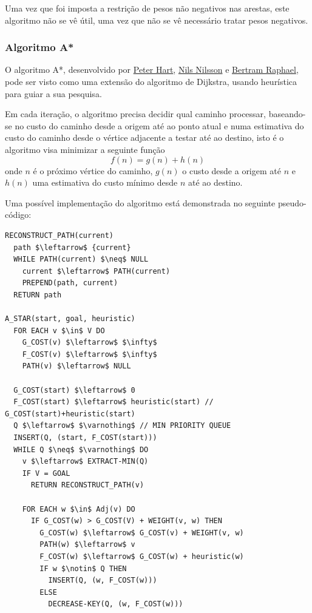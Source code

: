 \documentclass[article, a4paper, 12pt, oneside]{memoir}
\begin{document}
Uma vez que foi imposta a restrição de pesos não negativos nas arestas, este algoritmo não se vê útil, uma vez que não se vê necessário tratar pesos negativos.

\subsubsection{Algoritmo A*}
O algoritmo A*, desenvolvido por \href{https://en.wikipedia.org/wiki/Peter_E._Hart}{Peter Hart}, \href{https://en.wikipedia.org/wiki/Nils_John_Nilsson}{Nils Nilsson} e \href{https://en.wikipedia.org/wiki/Bertram_Raphael}{Bertram Raphael}, pode ser visto como uma extensão do algoritmo de Dijkstra, usando heurística para guiar a sua pesquisa.

Em cada iteração, o algoritmo precisa decidir qual caminho processar, baseando-se no custo  do caminho desde a origem até ao ponto atual e numa estimativa do custo do caminho desde o vértice adjacente a testar até ao destino, isto é o algoritmo visa minimizar a seguinte função
\begin{equation}
f(n) = g(n) + h(n)
\end{equation}
onde $n$ é o próximo vértice do caminho, $g(n)$ o custo desde a origem até $n$ e $h(n)$ uma estimativa do custo mínimo desde $n$ até ao destino.

Uma possível implementação do algoritmo está demonstrada no seguinte pseudo-código:
\begin{lstlisting}[frame=single, mathescape=true]
RECONSTRUCT_PATH(current)
  path $\leftarrow$ {current}
  WHILE PATH(current) $\neq$ NULL
    current $\leftarrow$ PATH(current)
    PREPEND(path, current)
  RETURN path

A_STAR(start, goal, heuristic)
  FOR EACH v $\in$ V DO
    G_COST(v) $\leftarrow$ $\infty$
    F_COST(v) $\leftarrow$ $\infty$
    PATH(v) $\leftarrow$ NULL

  G_COST(start) $\leftarrow$ 0
  F_COST(start) $\leftarrow$ heuristic(start) // G_COST(start)+heuristic(start)
  Q $\leftarrow$ $\varnothing$ // MIN PRIORITY QUEUE
  INSERT(Q, (start, F_COST(start)))
  WHILE Q $\neq$ $\varnothing$ DO
    v $\leftarrow$ EXTRACT-MIN(Q)
    IF V = GOAL
      RETURN RECONSTRUCT_PATH(v)

    FOR EACH w $\in$ Adj(v) DO
      IF G_COST(w) > G_COST(V) + WEIGHT(v, w) THEN
        G_COST(w) $\leftarrow$ G_COST(v) + WEIGHT(v, w)
        PATH(w) $\leftarrow$ v
        F_COST(w) $\leftarrow$ G_COST(w) + heuristic(w)
        IF w $\notin$ Q THEN
          INSERT(Q, (w, F_COST(w)))
        ELSE
          DECREASE-KEY(Q, (w, F_COST(w)))
\end{lstlisting}
\end{document}
